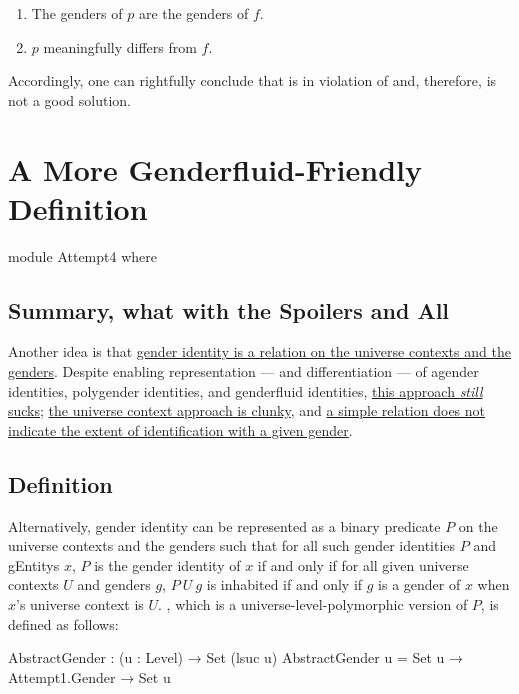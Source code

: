 \documentclass{article}
\theoremstyle{remark}
\newcommand{\summaryLink}[2]{\hyperref[#1]{#2}}
\begin{document}
\begin{enumerate}
  \item The genders of \(p\) are the genders of \(f\).
  \item \(p\) meaningfully differs from \(f\).
\end{enumerate}

Accordingly, one can rightfully conclude that  is in violation of  and, therefore, is not a good solution.

\section{A More Genderfluid-Friendly Definition}

\begin{code}
module Attempt4 where
\end{code}

\subsection{Summary, what with the Spoilers and All}
Another idea is that \summaryLink{sec:gender4definition}{gender identity is a relation on the universe contexts and the genders}.  Despite enabling representation --- and differentiation --- of agender identities, polygender identities, and genderfluid identities, \summaryLink{sec:gender4flaws}{this approach \emph{still} sucks}; \summaryLink{enum:gender4flawsClunky}{the universe context approach is clunky}, and \summaryLink{enum:gender4flawsExtent}{a simple relation does not indicate the extent of identification with a given gender}.

\subsection{Definition}\label{sec:gender4definition}
Alternatively, gender identity can be represented as a binary predicate \(P\) on the universe contexts and the genders such that for all such gender identities \(P\) and \glspl{gEntity} \(x\), \(P\) is the gender identity of \(x\) if and only if for all given universe contexts \(U\) and genders \(g\), \(P\ U\ g\) is inhabited if and only if \(g\) is a gender of \(x\) when \(x\)'s universe context is \(U\).  , which is a universe-level-polymorphic version of \(P\), is defined as follows:

\begin{code}
  AbstractGender : (u : Level) → Set (lsuc u)
  AbstractGender u = Set u → Attempt1.Gender → Set u
\end{code}
\end{document}
